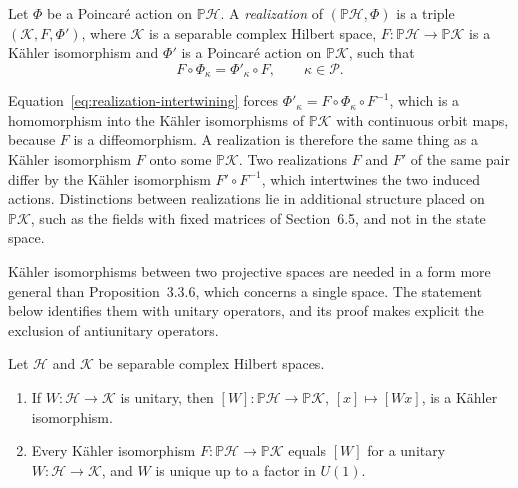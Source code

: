 \begin{definition}[Realization]\label{def:realization}
	Let $\Phi$ be a Poincar\'e action on $\mathbb{P}\mathcal{H}$. A \emph{realization} of $(\mathbb{P}\mathcal{H},\Phi)$ is a triple $(\mathcal{K},F,\Phi')$, where $\mathcal{K}$ is a separable complex Hilbert space, $F:\mathbb{P}\mathcal{H}\to\mathbb{P}\mathcal{K}$ is a Kähler isomorphism and $\Phi'$ is a Poincar\'e action on $\mathbb{P}\mathcal{K}$, such that
	\begin{equation}\label{eq:realization-intertwining}
		F\circ\Phi_\kappa=\Phi'_\kappa\circ F,\qquad \kappa\in\mathcal{P}.
	\end{equation}
\end{definition}

\begin{remark}
	Equation~\eqref{eq:realization-intertwining} forces $\Phi'_\kappa=F\circ\Phi_\kappa\circ F^{-1}$, which is a homomorphism into the Kähler isomorphisms of $\mathbb{P}\mathcal{K}$ with continuous orbit maps, because $F$ is a diffeomorphism. A realization is therefore the same thing as a Kähler isomorphism $F$ onto some $\mathbb{P}\mathcal{K}$. Two realizations $F$ and $F'$ of the same pair differ by the Kähler isomorphism $F'\circ F^{-1}$, which intertwines the two induced actions. Distinctions between realizations lie in additional structure placed on $\mathbb{P}\mathcal{K}$, such as the fields with fixed matrices of Section~6.5, and not in the state space.
\end{remark}

Kähler isomorphisms between two projective spaces are needed in a form more general than Proposition~3.3.6, which concerns a single space. The statement below identifies them with unitary operators, and its proof makes explicit the exclusion of antiunitary operators.

\begin{lemma}\label{lem:kahler-iso-two-spaces}
	Let $\mathcal{H}$ and $\mathcal{K}$ be separable complex Hilbert spaces.
	\begin{enumerate}
		\item If $W:\mathcal{H}\to\mathcal{K}$ is unitary, then $[W]:\mathbb{P}\mathcal{H}\to\mathbb{P}\mathcal{K}$, $[x]\mapsto[Wx]$, is a Kähler isomorphism.
		\item Every Kähler isomorphism $F:\mathbb{P}\mathcal{H}\to\mathbb{P}\mathcal{K}$ equals $[W]$ for a unitary $W:\mathcal{H}\to\mathcal{K}$, and $W$ is unique up to a factor in $U(1)$.
	\end{enumerate}
\end{lemma}

